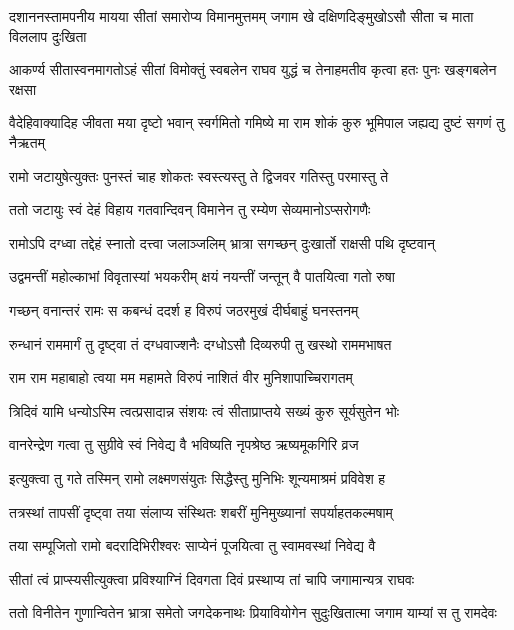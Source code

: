 \fourlineindentedshloka
{दशाननस्तामपनीय मायया}
{सीतां समारोप्य विमानमुत्तमम्}
{जगाम खे दक्षिणदिङ्मुखोऽसौ}
{सीता च माता विललाप दुःखिता} %

\fourlineindentedshloka
{आकर्ण्य सीतास्वनमागतोऽहं}
{सीतां विमोक्तुं स्वबलेन राघव}
{युद्धं च तेनाहमतीव कृत्वा}
{हतः पुनः खङ्गबलेन रक्षसा} %

\fourlineindentedshloka
{वैदेहिवाक्यादिह जीवता मया}
{दृष्टो भवान् स्वर्गमितो गमिष्ये}
{मा राम शोकं कुरु भूमिपाल}
{जह्यद्य दुष्टं सगणं तु नैऋतम्} %

\twolineshloka
{रामो जटायुषेत्युक्तः पुनस्तं चाह शोकतः}
{स्वस्त्यस्तु ते द्विजवर गतिस्तु परमास्तु ते} %

\twolineshloka
{ततो जटायुः स्वं देहं विहाय गतवान्दिवन्}
{विमानेन तु रम्येण सेव्यमानोऽप्सरोगणैः} %

\twolineshloka
{रामोऽपि दग्ध्वा तद्देहं स्नातो दत्त्वा जलाञ्जलिम्}
{भ्रात्रा सगच्छन् दुःखार्तो राक्षसी पथि दृष्टवान्} %

\twolineshloka
{उद्वमन्तीं महोल्काभां विवृतास्यां भयकरीम्}
{क्षयं नयन्तीं जन्तून् वै पातयित्वा गतो रुषा} %

\twolineshloka
{गच्छन् वनान्तरं रामः स कबन्धं ददर्श ह}
{विरुपं जठरमुखं दीर्घबाहुं घनस्तनम्} %

\twolineshloka
{रुन्धानं राममार्गं तु दृष्ट्वा तं दग्धवाज्शनैः}
{दग्धोऽसौ दिव्यरुपी तु खस्थो राममभाषत} %

\twolineshloka
{राम राम महाबाहो त्वया मम महामते}
{विरुपं नाशितं वीर मुनिशापाच्चिरागतम्} %

\twolineshloka
{त्रिदिवं यामि धन्योऽस्मि त्वत्प्रसादान्न संशयः}
{त्वं सीताप्राप्तये सख्यं कुरु सूर्यसुतेन भोः} %

\twolineshloka
{वानरेन्द्रेण गत्वा तु सुग्रीवे स्वं निवेद्य वै}
{भविष्यति नृपश्रेष्ठ ऋष्यमूकगिरि व्रज} %

\twolineshloka
{इत्युक्त्वा तु गते तस्मिन् रामो लक्ष्मणसंयुतः}
{सिद्धैस्तु मुनिभिः शून्यमाश्रमं प्रविवेश ह} %

\twolineshloka
{तत्रस्थां तापसीं दृष्ट्वा तया संलाप्य संस्थितः}
{शबरीं मुनिमुख्यानां सपर्याहतकल्मषाम्} %

\twolineshloka
{तया सम्पूजितो रामो बदरादिभिरीश्वरः}
{साप्येनं पूजयित्वा तु स्वामवस्थां निवेद्य वै} %

\twolineshloka
{सीतां त्वं प्राप्स्यसीत्युक्त्वा प्रविश्याग्निं दिवगता}
{दिवं प्रस्थाप्य तां चापि जगामान्यत्र राघवः} %

\fourlineindentedshloka
{ततो विनीतेन गुणान्वितेन}
{भ्रात्रा समेतो जगदेकनाथः}
{प्रियावियोगेन सुदुःखितात्मा}
{जगाम याम्यां स तु रामदेवः} %

